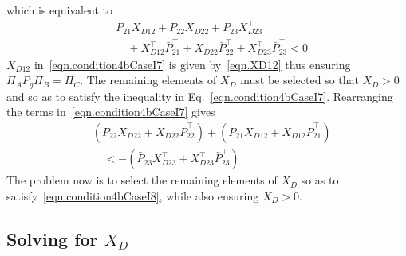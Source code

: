\documentclass[journal]{IEEEtran}
\theoremstyle{innercustomthm}
\begin{document}
  which is equivalent to
  \begin{equation}
    \label{eqn.condition4bCaseI7}
    \begin{split}
      &\bar{P}_{21}X_{D12} + \bar{P}_{22}X_{D22} + \bar{P}_{23}X_{D23}^{\top} \\
      & \quad + X_{D12}^{\top}\bar{P}_{21}^{\top} + X_{D22}\bar{P}_{22}^{\top} + X_{D23}^{\top}\bar{P}_{23}^{\top}
      < 0
    \end{split}
  \end{equation}
  $X_{D12}$ in\ \eqref{eqn.condition4bCaseI7} is given by\ \eqref{eqn.XD12} thus ensuring $\Pi_{A}P_{g}\Pi_{B}=\Pi_{C}$.
  The remaining elements of $X_{D}$ must be selected so that $X_{D}>0$ and so as to satisfy the inequality in Eq.\ \eqref{eqn.condition4bCaseI7}.
  Rearranging the terms in\ \eqref{eqn.condition4bCaseI7} gives
  {%
    \small
    \begin{equation}
      \label{eqn.condition4bCaseI8}
      \begin{split}
        &(\bar{P}_{22}X_{D22} + X_{D22}\bar{P}_{22}^{\top})
        +(\bar{P}_{21}X_{D12} + X_{D12}^{\top}\bar{P}_{21}^{\top}) \\
        & \quad <
        -(\bar{P}_{23}X_{D23}^{\top} + X_{D23}^{\top}\bar{P}_{23}^{\top})
      \end{split}
    \end{equation}
  }%
  The problem now is to select the remaining elements of $X_{D}$ so as to satisfy\ \eqref{eqn.condition4bCaseI8}, while also ensuring $X_{D}>0$.

  \subsection{Solving for \texorpdfstring{$X_{D}$}{XD}}
\end{document}
